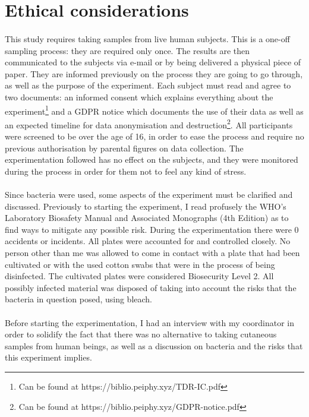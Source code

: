 \section{Ethical considerations}
\paragraph{}This study requires taking samples from live human subjects. This is a one-off sampling process: they are required only once. The results are then communicated to the subjects via e-mail or by being delivered a physical piece of paper. They are informed previously on the process they are going to go through, as well as the purpose of the experiment. Each subject must read and agree to two documents: an informed consent which explains everything about the experiment\footnote{Can be found at https://biblio.peiphy.xyz/TDR-IC.pdf} and a GDPR notice which documents the use of their data as well as an expected timeline for data anonymisation and destruction\footnote{Can be found at https://biblio.peiphy.xyz/GDPR-notice.pdf}. All participants were screened to be over the age of 16, in order to ease the process and require no previous authorisation by parental figures on data collection. The experimentation followed has no effect on the subjects, and they were monitored during the process in order for them not to feel any kind of stress.
\paragraph{}Since bacteria were used, some aspects of the experiment must be clarified and discussed. Previously to starting the experiment, I read profusely the WHO's Laboratory Biosafety Manual and Associated Monographs (4th Edition)\cite{worldhealthorganizationLaboratoryBiosafetyManual2020} as to find ways to mitigate any possible risk. During the experimentation there were 0 accidents or incidents. All plates were accounted for and controlled closely. No person other than me was allowed to come in contact with a plate that had been cultivated or with the used cotton swabs that were in the process of being disinfected. The cultivated plates were considered Biosecurity Level 2. All possibly infected material was disposed of taking into account the risks that the bacteria in question posed, using bleach.
\paragraph{}Before starting the experimentation, I had an interview with my coordinator in order to solidify the fact that there was no alternative to taking cutaneous samples from human beings, as well as a discussion on bacteria and the risks that this experiment implies.